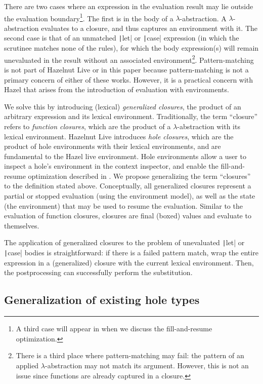 There are two cases where an expression in the evaluation result may lie outside the evaluation boundary\footnote{A third case will appear in  when we discuss the fill-and-resume optimization.}. The first is in the body of a $\lambda$-abstraction. A $\lambda$-abstraction evaluates to a closure, and thus captures an environment with it. The second case is that of an unmatched \texttt|let| or \texttt|case| expression (in which the scrutinee matches none of the rules), for which the body expression(s) will remain unevaluated in the result without an associated environment\footnote{There is a third place where pattern-matching may fail: the pattern of an applied $\lambda$-abstraction may not match its argument. However, this is not an issue since functions are already captured in a closure.}. Pattern-matching is not part of Hazelnut Live or in this paper because pattern-matching is not a primary concern of either of these works. However, it is a practical concern with Hazel that arises from the introduction of evaluation with environments.

We solve this by introducing (lexical) \textit{generalized closures}, the product of an arbitrary expression and its lexical environment. Traditionally, the term ``closure'' refers to \textit{function closures}, which are the product of a $\lambda$-abstraction with its lexical environment. Hazelnut Live introduces \textit{hole closures}, which are the product of hole environments with their lexical environments, and are fundamental to the Hazel live environment. Hole environments allow a user to inspect a hole's environment in the context inspector, and enable the fill-and-resume optimization described in . We propose generalizing the term ``closures'' to the definition stated above. Conceptually, all generalized closures represent a partial or stopped evaluation (using the environment model), as well as the state (the environment) that may be used to resume the evaluation. Similar to the evaluation of function closures, closures are final (boxed) values and evaluate to themselves.

The application of generalized closures to the problem of unevaluated \texttt|let| or \texttt|case| bodies is straightforward: if there is a failed pattern match, wrap the entire expression in a (generalized) closure with the current lexical environment. Then, the postprocessing can successfully perform the substitution.

\subsection{Generalization of existing hole types}
\label{sec:generalized-closures-datatypes}

